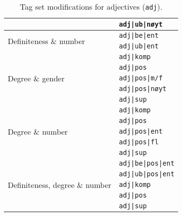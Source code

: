 \documentclass[a4paper,12pt,english]{book}
\begin{document}
\begin{appendices}
\begin{table}
\begin{tabular}{@{}ll@{}}
            & \texttt{adj|ub|nøyt} \\
            \midrule
            \multirow{2}{*}{Definiteness \& number}
            & \texttt{adj|be|ent} \\
            & \texttt{adj|ub|ent} \\
            \midrule
            \multirow{5}{*}{Degree \& gender}
            & \texttt{adj|komp} \\
            & \texttt{adj|pos} \\
            & \texttt{adj|pos|m/f} \\
            & \texttt{adj|pos|nøyt} \\
            & \texttt{adj|sup} \\
            \midrule
            \multirow{5}{*}{Degree \& number}
            & \texttt{adj|komp} \\
            & \texttt{adj|pos} \\
            & \texttt{adj|pos|ent} \\
            & \texttt{adj|pos|fl} \\
            & \texttt{adj|sup} \\
            \midrule
            \multirow{5}{*}{Definiteness, degree \& number}
            & \texttt{adj|be|pos|ent} \\
            & \texttt{adj|ub|pos|ent} \\
            & \texttt{adj|komp} \\
            & \texttt{adj|pos} \\
            & \texttt{adj|sup} \\
            \bottomrule
        \end{tabular}
        \caption{Tag set modifications for adjectives (\texttt{adj}).}
        \label{adjtagsets}
    \end{table}


\end{appendices}
\end{document}
